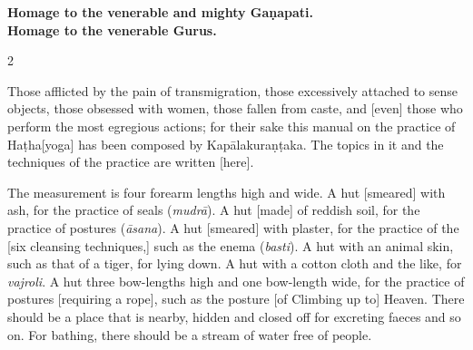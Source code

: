 \newpage

\begin{nohyp}
\null\vspace{0.1cm}

\begin{eng}
\centerline{}
\vskip 7pt

\begin{center}
{\large\bfseries Homage to the venerable and mighty Gaṇapati.\\[4pt] 
Homage to the venerable Gurus.}
\end{center}
\end{eng}
\vskip 7pt

\begin{multicols}{2}
\begin{eng}
Those afflicted by the pain of transmigration, those excessively attached to sense objects, those obsessed with women, those fallen from caste, and [even] those who perform the most egregious actions; for their sake this manual on the practice of Haṭha[yoga] has been composed by Kapālakuraṇṭaka. The topics in it and the techniques of the practice are written [here].
\vskip 7pt


The measurement is four forearm lengths high and wide. A hut [smeared] with ash, for the practice of seals (\textit{mudrā}). A hut [made] of reddish soil, for the practice of postures (\textit{āsana}). A hut [smeared] with plaster, for the practice of the [six cleansing techniques,] such as the enema (\textit{basti}).  A hut with an animal skin, such as that of a tiger, for lying down.  A hut with a cotton cloth and the like, for \textit{vajroli}. A hut three bow-lengths high and one bow-length wide, for the practice of postures [requiring a rope], such as the posture [of Climbing up to] Heaven.  There should be a place that is nearby, hidden and closed off for excreting faeces and so on. For bathing, there should be a stream of water free of people.
\vskip 7pt



\end{eng}
\end{multicols}
\end{nohyp}
